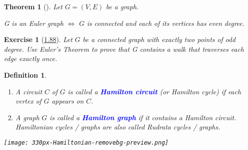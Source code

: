 \documentclass[10pt]{report}
\numberwithin{dummy}{section}
\theoremstyle{ocrenumbox}
\newtheorem{definitionT}{Exercise}[]
\newtheorem{definitionTTT}{Theorem}[]
\theoremstyle{grayman}
\newtheorem{definitionTTTT}{Definition}[]
\newenvironment{exo}{\begin{dBox}\begin{definitionT}}{\end{definitionT}\end{dBox}}
\newenvironment{thm}{\begin{tBox}\begin{definitionTTT}}{\end{definitionTTT}\end{tBox}}
\newenvironment{voc}{\begin{vBox}\begin{definitionTTTT}}{\end{definitionTTTT}\end{vBox}}
\begin{document}
\begin{thm}[]
Let $G = (V, E)$ be a graph.
\begin{center}
    G is an Euler graph
$\Longleftrightarrow$ $G$ is connected and each of its vertices has even degree.
\end{center}
\end{thm}
\begin{exo}[\hypertarget{exo188}{\hyperlink{so188}{1.88}}] 
Let $G$ be a connected graph with exactly two points of odd
degree. Use Euler’s Theorem to prove that G contains a walk that traverses
each edge exactly once.
\end{exo}
\begin{voc}{}{}\leavevmode
\begin{enumerate}
    \item A circuit $C$ of $G$ is called a \textbf{\textcolor{blue}{Hamilton circuit}} (or Hamilton cycle) if each vertex of $G$ appears on $C$. 
    \item A graph $G$ is called a \textbf{\textcolor{blue}{Hamilton graph}} if it contains a Hamilton circuit. Hamiltonian cycles / graphs are also called Rudrata cycles / graphs.
\end{enumerate}
\begin{center}
    \texttt{[image: 330px-Hamiltonian-removebg-preview.png]}
    \end{center}
\end{voc}
\end{document}

